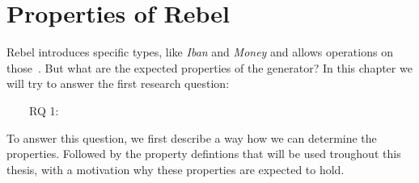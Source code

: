 \chapter{Properties of Rebel}
\label{cpt:properties}



Rebel introduces specific types, like \textit{Iban} and \textit{Money} and
allows operations on those~\cite{stoel2016solving}. But what are the expected
properties of the generator? In this chapter we will try to answer the first
research question:
\begin{description}
	\item [~~~~RQ 1:] \rqOne
\end{description}
To answer this question, we first describe a way how we can determine the
properties. Followed by the property defintions that will be used troughout this
thesis, with a motivation why these properties are expected to hold.


